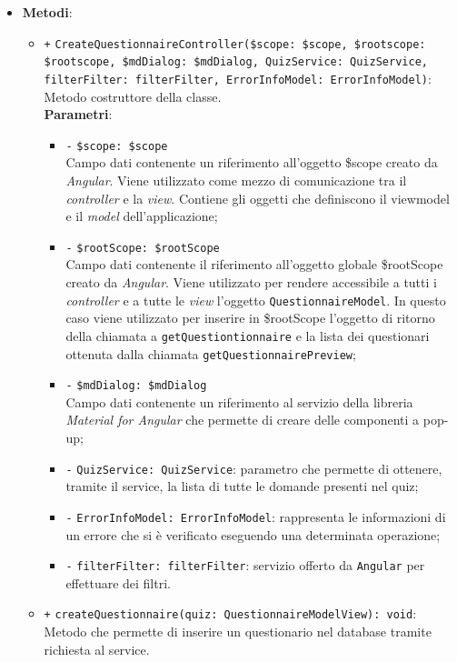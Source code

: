 \begin{itemize}
\begin{itemize}
	\end{itemize}
	\item \textbf{Metodi}:
	\begin{itemize}
		\item \texttt{+} \texttt{CreateQuestionnaireController(\$scope: \$scope, \$rootscope: \$rootscope, \$mdDialog: \$mdDialog, QuizService: QuizService, filterFilter: filterFilter, ErrorInfoModel: ErrorInfoModel)}: \\ Metodo costruttore della classe. \\
		\textbf{Parametri}:
		\begin{itemize}
			\item \texttt{-} \texttt{\$scope: \$scope} \\
			Campo dati contenente un riferimento all'oggetto \$scope creato da \textit{Angular}. Viene utilizzato come mezzo di comunicazione tra il \textit{controller} e la \textit{view}. Contiene gli oggetti che definiscono il viewmodel e il \textit{model} dell'applicazione;
				\item \texttt{-} \texttt{\$rootScope: \$rootScope} \\
				Campo dati contenente il riferimento all'oggetto globale \$rootScope creato da \textit{Angular}. Viene utilizzato per rendere accessibile a tutti i \textit{controller} e a tutte le \textit{view} l'oggetto \texttt{QuestionnaireModel}. In questo caso viene utilizzato per inserire in \$rootScope l'oggetto di ritorno della chiamata a \texttt{getQuestiontionnaire} e la lista dei questionari ottenuta dalla chiamata \texttt{getQuestionnairePreview};
			\item \texttt{-} \texttt{\$mdDialog: \$mdDialog} \\
			Campo dati contenente un riferimento al servizio della libreria \textit{Material for Angular} che permette di creare delle componenti a pop-up;
			\item \texttt{-} \texttt{QuizService: QuizService}: parametro che permette di ottenere, tramite il service, la lista di tutte le domande presenti nel quiz;
			\item \texttt{-} \texttt{ErrorInfoModel: ErrorInfoModel}: rappresenta le informazioni di un errore che si è verificato eseguendo una determinata operazione;
			\item \texttt{-} \texttt{filterFilter: filterFilter}: servizio offerto da \texttt{Angular} per effettuare dei filtri.
		\end{itemize}
		\item \texttt{+} \texttt{createQuestionnaire(quiz: QuestionnaireModelView): void}: \\Metodo che permette di inserire un questionario nel database tramite richiesta al service. \\

\end{itemize}
\end{itemize}
